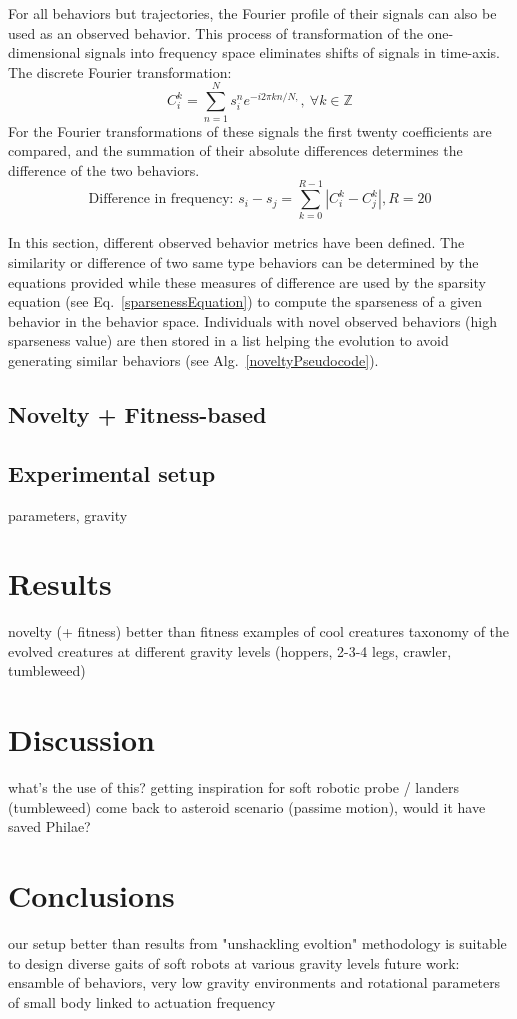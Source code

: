 \documentclass{sig-alternate}
\begin{document}
For all behaviors but trajectories, the Fourier profile of their signals can also be used as an observed behavior. This process of transformation of the one-dimensional signals into frequency space eliminates shifts of signals in time-axis. The discrete Fourier transformation:
\begin{equation}
C_i^k = \sum_{n=1}^{N} s_i^n e^{-i 2 \pi k n/N,},~\forall k \in \mathbb{Z}
\end{equation}
For the Fourier transformations of these signals the first twenty coefficients are compared, and the summation of their absolute differences determines the difference of the two behaviors.
\begin{equation}
\text{Difference in frequency: } s_i - s_j = \sum_{k=0}^{R-1} | C_i^k - C_j^k |, R=20
\end{equation}

In this section, different observed behavior metrics have been defined. The similarity or difference of two same type behaviors can be determined by the equations provided while these measures of difference are used by the sparsity equation (see Eq.~\ref{sparsenessEquation}) to compute the sparseness of a given behavior in the behavior space. Individuals with novel observed behaviors (high sparseness value) are then stored in a list helping the evolution to avoid generating similar behaviors (see Alg.~\ref{noveltyPseudocode}).

\subsection{Novelty + Fitness-based}

\subsection{Experimental setup}
parameters, gravity

\section{Results}
novelty (+ fitness) better than fitness
examples of cool creatures
taxonomy of the evolved creatures at different gravity levels (hoppers, 2-3-4 legs, crawler, tumbleweed) 

\section{Discussion}
what's the use of this?
getting inspiration for soft robotic probe / landers (tumbleweed)
come back to asteroid scenario (passime motion), would it have saved Philae?

\section{Conclusions}
our setup better than results from "unshackling evoltion"
methodology is suitable to design diverse gaits of soft robots at various gravity levels
future work: ensamble of behaviors, very low gravity environments and rotational parameters of small body linked to actuation frequency



\end{document}

